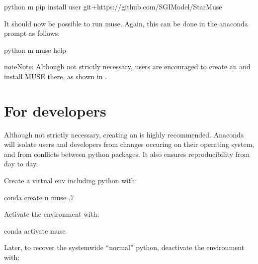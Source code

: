\documentclass[letterpaper,10pt,english]{sphinxmanual}
\begin{document}
\begin{sphinxVerbatim}[commandchars=\\\{\}]
python \PYGZhy{}m pip install \PYGZhy{}\PYGZhy{}user git+https://github.com/SGIModel/StarMuse
\end{sphinxVerbatim}

It should now be possible to run muse. Again, this can be done in the anaconda prompt as follows:

\begin{sphinxVerbatim}[commandchars=\\\{\}]
python \PYGZhy{}m muse \PYGZhy{}\PYGZhy{}help
\end{sphinxVerbatim}

\begin{sphinxadmonition}{note}{Note:}
Although not strictly necessary, users are encouraged to create an  and install MUSE there, as shown in {\hyperref[\detokenize{installing-muse:installation-devs}]{}}.
\end{sphinxadmonition}


\section{For developers}
\label{\detokenize{installing-muse:for-developers}}\label{\detokenize{installing-muse:installation-devs}}
Although not strictly necessary, creating an  is highly
recommended. Anaconda will isolate users and developers from changes occuring on their
operating system, and from conflicts between python packages. It also ensures reproducibility
from day to day.

Create a virtual env including python with:

\begin{sphinxVerbatim}[commandchars=\\\{\}]
conda create \PYGZhy{}n muse .7
\end{sphinxVerbatim}

Activate the environment with:

\begin{sphinxVerbatim}[commandchars=\\\{\}]
conda activate muse
\end{sphinxVerbatim}

Later, to recover the system\sphinxhyphen{}wide “normal” python, deactivate the environment with:
\end{document}
